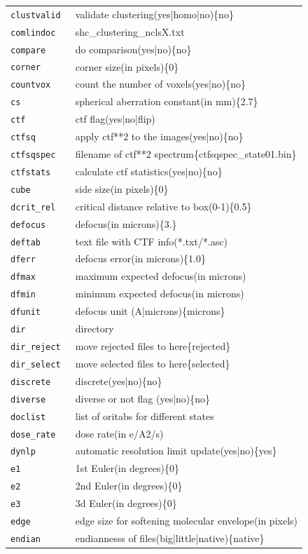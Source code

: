 \documentclass[a4paper,11pt]{article}
\begin{document}
\begin{tabular}{ll}
\texttt{clustvalid   }&{ validate clustering(yes|homo|no)\{no\}}\\
\texttt{comlindoc    }&{ shc\_clustering\_nclsX.txt}\\
\texttt{compare      }&{ do comparison(yes|no)\{no\}}\\
\texttt{corner       }&{ corner size(in pixels)\{0\}}\\
\texttt{countvox     }&{ count the number of voxels(yes|no)\{no\}}\\
\texttt{cs           }&{ spherical aberration constant(in mm)\{2.7\}}\\
\texttt{ctf          }&{ ctf flag(yes|no|flip)}\\
\texttt{ctfsq        }&{ apply ctf**2 to the images(yes|no)\{no\}}\\
\texttt{ctfsqspec    }&{ filename of ctf**2 spectrum\{ctfsqspec\_state01.bin\}}\\
\texttt{ctfstats     }&{ calculate ctf statistics(yes|no)\{no\}}\\
\texttt{cube         }&{ side size(in pixels)\{0\}}\\
\texttt{dcrit\_rel    }&{ critical distance relative to box(0-1)\{0.5\}}\\
\texttt{defocus      }&{ defocus(in microns)\{3.\}}\\
\texttt{deftab       }&{ text file with CTF info(*.txt/*.asc)}\\
\texttt{dferr        }&{ defocus error(in microns)\{1.0\}}\\
\texttt{dfmax        }&{ maximum expected defocus(in microns)}\\
\texttt{dfmin        }&{ minimum expected defocus(in microns)}\\
\texttt{dfunit       }&{ defocus unit (A|microns)\{microns\}}\\
\texttt{dir          }&{ directory}\\
\texttt{dir\_reject   }&{ move rejected files to here\{rejected\}}\\
\texttt{dir\_select   }&{ move selected files to here\{selected\}}\\
\texttt{discrete     }&{ discrete(yes|no)\{no\}}\\
\texttt{diverse      }&{ diverse or not flag (yes|no)\{no\}}\\
\texttt{doclist      }&{ list of oritabs for different states}\\
\texttt{dose\_rate    }&{ dose rate(in e/A2/s)}\\
\texttt{dynlp        }&{ automatic resolution limit update(yes|no)\{yes\}}\\
\texttt{e1           }&{ 1st Euler(in degrees)\{0\}}\\
\texttt{e2           }&{ 2nd Euler(in degrees)\{0\}}\\
\texttt{e3           }&{ 3d Euler(in degrees)\{0\}}\\
\texttt{edge         }&{ edge size for softening molecular envelope(in pixels)}\\
\texttt{endian       }&{ endiannesss of files(big|little|native)\{native\}}\\
\end{tabular}
\end{document}
